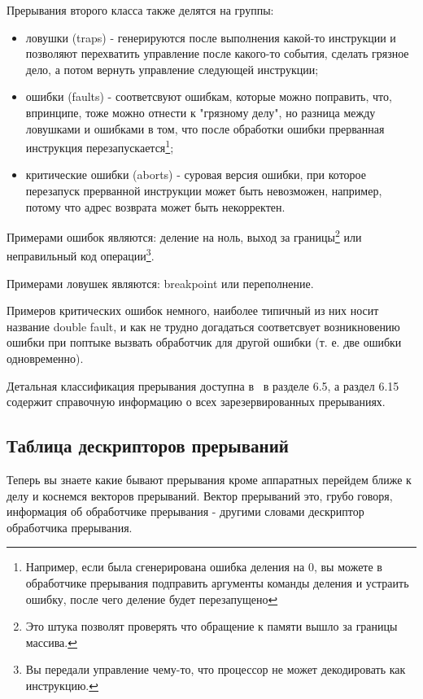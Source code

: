 Прерывания второго класса также делятся на группы:
\begin{itemize}
  \item ловушки (traps) - генерируются после выполнения какой-то инструкции и
        позволяют перехватить управление после какого-то события, сделать
        грязное дело, а потом вернуть управление следующей инструкции;
  \item ошибки (faults) - соответсвуют ошибкам, которые можно поправить, что,
        впринципе, тоже можно отнести к "грязному делу", но разница между
        ловушками и ошибками в том, что после обработки ошибки прерванная
        инструкция перезапускается\footnote{Например, если была сгенерирована
        ошибка деления на 0, вы можете в обработчике прерывания подправить
        аргументы команды деления и устраить ошибку, после чего деление будет
        перезапущено};
  \item критические ошибки (aborts) - суровая версия ошибки, при которое
        перезапуск прерванной инструкции может быть невозможен, например, потому
        что адрес возврата может быть некорректен.
\end{itemize}

Примерами ошибок являются: деление на ноль, выход за границы\footnote{Это штука
позволят проверять что обращение к памяти вышло за границы массива.} или
неправильный код операции\footnote{Вы передали управление чему-то, что процессор
не может декодировать как инструкцию.}.

Примерами ловушек являются: breakpoint или переполнение.

Примеров критических ошибок немного, наиболее типичный из них носит название
double fault, и как не трудно догадаться соответсвует возникновению ошибки при
поптыке вызвать обработчик для другой ошибки (т. е. две ошибки одновременно).

Детальная классификация прерывания доступна в~\cite{INTEL:SYSV3} в разделе 6.5,
а раздел 6.15 содержит справочную информацию о всех зарезервированных
прерываниях.

\subsection{Таблица дескрипторов прерываний}

Теперь вы знаете какие бывают прерывания кроме аппаратных перейдем ближе к делу
и коснемся векторов прерываний. Вектор прерываний это, грубо говоря, информация
об обработчике прерывания - другими словами дескриптор обработчика прерывания.

